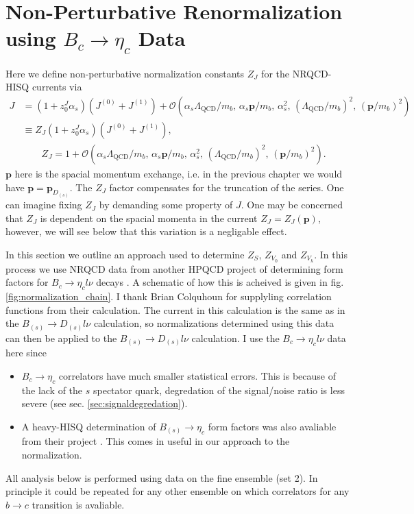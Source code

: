 \section{Non-Perturbative Renormalization using $B_c\to \eta_c$ Data}
\label{sec:Bcetac}

Here we define non-perturbative normalization constants $Z_J$ for the NRQCD-HISQ currents via 
\begin{align}
  \nonumber
	J &= ( 1 + z^J_0 \alpha_s )( J^{(0)} + J^{(1)} ) + \mathcal{O}( \alpha_s \Lambda_{\text{QCD}} / m_b,\, \alpha_s {\textbf{p}}/m_b, \, \alpha_s^2, \, (\Lambda_{\text{QCD}}/m_b)^2, \, ({\textbf{p}}/m_b)^2 ) \\
	&\equiv Z_{J}( 1 + z^J_0 \alpha_s )( J^{(0)} + J^{(1)} ), \\ \nonumber &\quad\quad Z_{J} = 1 + \mathcal{O}(\alpha_s \Lambda_{\text{QCD}} /m_b,\, \alpha_s {\textbf{p}}/m_b, \, \alpha_s^2, \,(\Lambda_{\text{QCD}}/m_b)^2, \,({\textbf{p}}/m_b)^2 ).
	\label{eq:overall}
\end{align}
${\textbf{p}}$ here is the spacial momentum exchange, i.e. in the previous chapter we would have ${\textbf{p}}={\textbf{p}}_{D_{(s)}}$. The $Z_J$ factor compensates for the truncation of the series. One can imagine fixing $Z_J$ by demanding some property of $J$. One may be concerned that $Z_J$ is dependent on the spacial momenta in the current $Z_J=Z_J({\textbf{p}})$, however, we will see below that this variation is a negligable effect.

In this section we outline an approach used to determine $Z_S$, $Z_{V_0}$ and $Z_{V_k}$. In this process we use NRQCD data from another HPQCD project of determining form factors for $B_c \to \eta_c l\nu$ decays \cite{Colquhoun:2016osw}. A schematic of how this is acheived is given in fig. \ref{fig:normalization_chain}. I thank Brian Colquhoun for supplyling correlation functions from their calculation. The current in this calculation is the same as in the $B_{(s)}\to D_{(s)}l\nu$ calculation, so normalizations determined using this data can then be applied to the $B_{(s)}\to D_{(s)}l\nu$ calculation. I use the $B_c \to \eta_c l\nu$ data here since
\begin{itemize}
\item
  $B_c\to \eta_c$ correlators have much smaller statistical errors. This is because of the lack of the $s$ spectator quark, degredation of the signal/noise ratio is less severe (see sec. \ref{sec:signaldegredation}).
\item
  A heavy-HISQ determination of $B_{(s)}\to \eta_c$ form factors was also avaliable from their project \cite{Colquhoun:2016osw}. This comes in useful in our approach to the normalization.
\end{itemize}
All analysis below is performed using data on the fine ensemble (set 2). In principle it could be repeated for any other ensemble on which correlators for any $b\to c$ transition is avaliable.

